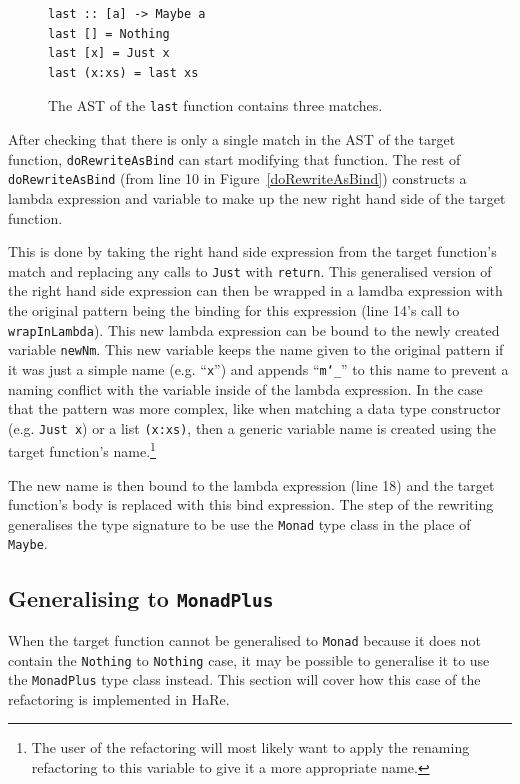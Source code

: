 \begin{figure}[t]
\begin{lstlisting}
last :: [a] -> Maybe a
last [] = Nothing
last [x] = Just x
last (x:xs) = last xs
\end{lstlisting}
\caption{The AST of the \texttt{last} function contains three matches.}
\label{matchExample}
\end{figure}

After checking that there is only a single match in the AST of the target function, \texttt{doRewriteAsBind} can start modifying that function. The rest of \texttt{doRewriteAsBind} (from line 10 in Figure~\ref{doRewriteAsBind}) constructs a lambda expression and variable to make up the new right hand side of the target function. 

This is done by taking the right hand side expression from the target function's match and replacing any calls to \texttt{Just} with \texttt{return}. This generalised version of the right hand side expression can then be wrapped in a lamdba expression with the original pattern being the binding for this expression (line 14's call to \texttt{wrapInLambda}). This new lambda expression can be bound to the newly created variable \texttt{newNm}. This new variable keeps the name given to the original pattern if it was just a simple name (e.g. ``\texttt{x}'') and appends ``\texttt{m\char`_}'' to this name to prevent a naming conflict with the variable inside of the lambda expression. In the case that the pattern was more complex, like when matching a data type constructor (e.g. \texttt{Just x}) or a list \texttt{(x:xs)}, then a generic variable name is created using the target function's name.\footnote{The user of the refactoring will most likely want to apply the renaming refactoring to this variable to give it a more appropriate name.}

The new name is then bound to the lambda expression (line 18) and the target function's body is replaced with this bind expression. The step of the rewriting generalises the type signature to be use the \texttt{Monad} type class in the place of \texttt{Maybe}.

\subsection{Generalising to \texttt{MonadPlus}}

When the target function cannot be generalised to \texttt{Monad} because it does not contain the \texttt{Nothing} to \texttt{Nothing} case, it may be possible to generalise it to use the \texttt{MonadPlus} type class instead. This section will cover how this case of the refactoring is implemented in HaRe.

